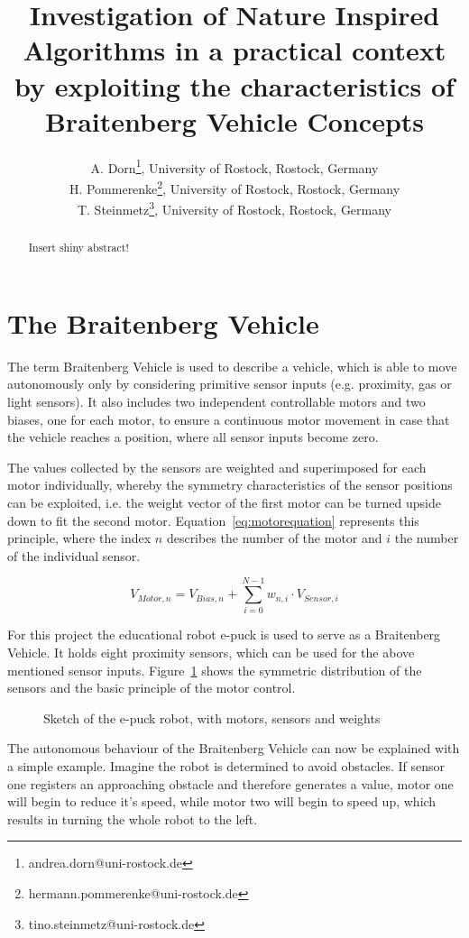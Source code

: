 \documentclass[a4paper]{jacow}
\begin{document}
\title{Investigation of Nature Inspired Algorithms in a practical context by exploiting the characteristics of Braitenberg Vehicle Concepts}

\author{A. Dorn\thanks{andrea.dorn@uni-rostock.de}, University of Rostock, Rostock, Germany \\
		H. Pommerenke\thanks{hermann.pommerenke@uni-rostock.de}, University of Rostock, Rostock, Germany \\
		T. Steinmetz\thanks{tino.steinmetz@uni-rostock.de}, University of Rostock, Rostock, Germany}
	
\maketitle


\begin{abstract}
   Insert shiny abstract!
\end{abstract}

\section{The Braitenberg Vehicle}
The term Braitenberg Vehicle is used to describe a vehicle, which is able to move autonomously only by considering primitive sensor inputs (e.g. proximity, gas or light sensors). It also includes two independent controllable motors and two biases, one for each motor, to ensure a continuous motor movement in case that the vehicle reaches a position, where all sensor inputs become zero.

The values collected by the sensors are weighted and superimposed for each motor individually, whereby the symmetry characteristics of the sensor positions can be exploited, i.e. the weight vector of the first motor can be turned upside down to fit the second motor. Equation~\ref{eq:motorequation} represents this principle, where the index $n$ describes the number of the motor and $i$ the number of the individual sensor.

\begin{equation}
	V_{Motor,n} = V_{Bias,n} + \sum\limits_{i=0}^{N-1}w_{n,i}\cdot V_{Sensor,i}
	\label{eq:motorequation}
\end{equation}

For this project the educational robot e-puck is used to serve as a Braitenberg Vehicle. It holds eight proximity sensors, which can be used for the above mentioned sensor inputs. Figure~\ref{fig:epuck} shows the symmetric distribution of the sensors and the basic principle of the motor control.

\begin{figure}[hbt]
	\centering
	
	\caption{Sketch of the e-puck robot, with motors, sensors and weights}
	\label{fig:epuck}
\end{figure}

The autonomous behaviour of the Braitenberg Vehicle can now be explained with a simple example. Imagine the robot is determined to avoid obstacles. If sensor one registers an approaching obstacle and therefore generates a value, motor one will begin to reduce it's speed, while motor two will begin to speed up, which results in turning the whole robot to the left.
\end{document}
